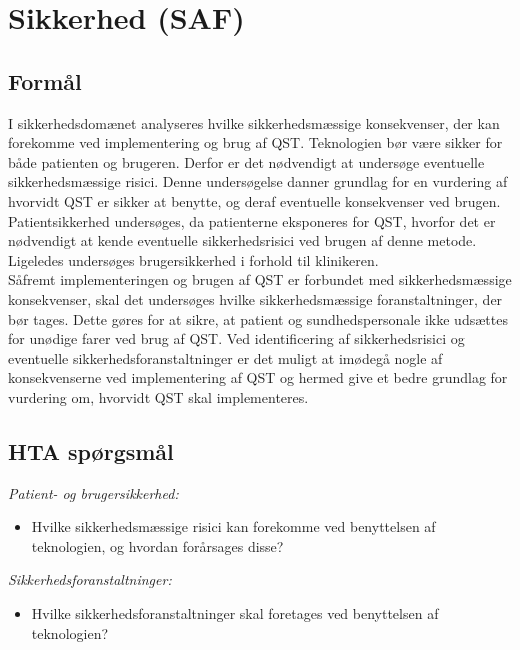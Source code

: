 \section{Sikkerhed (SAF)}
\subsection{Formål}
I sikkerhedsdomænet analyseres hvilke sikkerhedsmæssige konsekvenser, der kan forekomme ved implementering og brug af QST. Teknologien bør være sikker for både patienten og brugeren. Derfor er det nødvendigt at undersøge eventuelle sikkerhedsmæssige risici. Denne undersøgelse danner grundlag for en vurdering af hvorvidt QST er sikker at benytte, og deraf eventuelle konsekvenser ved brugen. \\
Patientsikkerhed undersøges, da patienterne eksponeres for QST, hvorfor det er nødvendigt at kende eventuelle sikkerhedsrisici ved brugen af denne metode. Ligeledes undersøges brugersikkerhed i forhold til klinikeren. \\
Såfremt implementeringen og brugen af QST er forbundet med sikkerhedsmæssige konsekvenser, skal det undersøges hvilke sikkerhedsmæssige foranstaltninger, der bør tages. Dette gøres for at sikre, at patient og sundhedspersonale ikke udsættes for unødige farer ved brug af QST. Ved identificering af sikkerhedsrisici og eventuelle sikkerhedsforanstaltninger er det muligt at imødegå nogle af konsekvenserne ved implementering af QST og hermed give et bedre grundlag for vurdering om, hvorvidt QST skal implementeres.
\subsection{HTA spørgsmål}
\textit{Patient- og brugersikkerhed:}
\begin{itemize}
\item Hvilke sikkerhedsmæssige risici kan forekomme ved benyttelsen af teknologien, og hvordan forårsages disse? %
\end{itemize}
\textit{Sikkerhedsforanstaltninger:}
\begin{itemize}
\item Hvilke sikkerhedsforanstaltninger skal foretages ved benyttelsen af teknologien?  %
\end{itemize}


